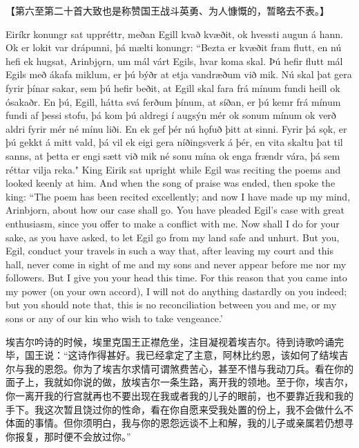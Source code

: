\medskip
【第六至第二十首大致也是称赞国王战斗英勇、为人慷慨的，暂略去不表。】
\medskip
\begin{paracol}{2}
  Eiríkr konungr sat uppréttr, meðan Egill kvað kvæðit, ok hvessti augun á hann. Ok er lokit var drápunni, þá mælti konungr: ``Bezta er kvæðit fram flutt, en nú hefi ek hugsat, Arinbjǫrn, um mál várt Egils, hvar koma skal. Þú hefir flutt mál Egils með ákafa miklum, er þú býðr at etja vandræðum við mik. Nú skal þat gera fyrir þínar sakar, sem þú hefir beðit, at Egill skal fara frá mínum fundi heill ok ósakaðr. En þú, Egill, hátta svá ferðum þínum, at síðan, er þú kemr frá mínum fundi af þessi stofu, þá kom þú aldregi í augsýn mér ok sonum mínum ok verð aldri fyrir mér né mínu liði. En ek gef þér nú hǫfuð þitt at sinni. Fyrir þá sǫk, er þú gekkt á mitt vald, þá vil ek eigi gera níðingsverk á þér, en vita skaltu þat til sanns, at þetta er engi sætt við mik né sonu mína ok enga frændr vára, þá sem réttar vilja reka."
  \switchcolumn
  King Eirik sat upright while Egil was reciting the poems and looked keenly at him. And when the song of praise was ended, then spoke the king: ``The poem has been recited excellently; and now I have made up my mind, Arinbjorn, about how our case shall go. You have pleaded Egil's case with great enthusiasm, since you offer to make a conflict with me. Now shall I do for your sake, as you have asked, to let Egil go from my land safe and unhurt. But you, Egil, conduct your travels in such a way that, after leaving my court and this hall, never come in sight of me and my sons and never appear before me nor my followers. But I give you your head this time. For this reason that you came into my power (on your own accord), I will not do anything dastardly on you indeed; but you should note that, this is no reconciliation between you and me, or my sons or any of our kin who wish to take vengeance.'
\end{paracol}
\begin{translation*}{}
  埃吉尔吟诗的时候，埃里克国王正襟危坐，注目凝视着埃吉尔。待到诗歌吟诵完毕，国王说：“这诗作得甚好。我已经拿定了主意，阿林比约恩，该如何了结埃吉尔与我的恩怨。你为了埃吉尔求情可谓煞费苦心，甚至不惜与我动刀兵。看在你的面子上，我就如你说的做，放埃吉尔一条生路，离开我的领地。至于你，埃吉尔，你一离开我的行宫就再也不要出现在我或者我的儿子的眼前，也不要靠近我和我的手下。我这次暂且饶过你的性命，看在你自愿来受我处置的份上，我不会做什么不体面的事情。但你须明白，我与你的恩怨远谈不上和解，我的儿子或亲属若仍想寻你报复，那时便不会放过你。”
\end{translation*}

